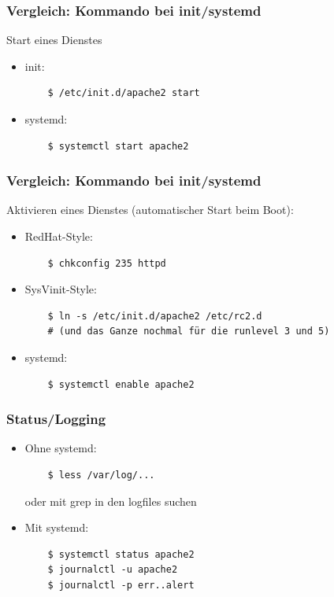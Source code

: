\begin{frame}[fragile]

\frametitle{Vergleich: Kommando bei init/systemd}

  Start eines Dienstes
  \begin{itemize}
    \item init:
    \begin{verbatim}
    $ /etc/init.d/apache2 start
    \end{verbatim}

    \item systemd:
    \begin{verbatim}
    $ systemctl start apache2
    \end{verbatim}
  \end{itemize}

\end{frame}

\begin{frame}[fragile]
\frametitle{Vergleich: Kommando bei init/systemd}

  Aktivieren eines Dienstes (automatischer Start beim Boot):
  \begin{itemize}

    \item RedHat-Style:
    \begin{verbatim}
    $ chkconfig 235 httpd
    \end{verbatim}

    \item SysVinit-Style:
    \begin{verbatim}
    $ ln -s /etc/init.d/apache2 /etc/rc2.d
    # (und das Ganze nochmal für die runlevel 3 und 5)
    \end{verbatim}

    \item systemd:
    \begin{verbatim}
    $ systemctl enable apache2
    \end{verbatim}

  \end{itemize}

\end{frame}


\begin{frame}[fragile]
\frametitle{Status/Logging}

  \begin{itemize}

    \item Ohne systemd:
    \begin{verbatim}
    $ less /var/log/...
    \end{verbatim}
    oder mit grep in den logfiles suchen

    \item Mit systemd:
    \begin{verbatim}
    $ systemctl status apache2
    $ journalctl -u apache2
    $ journalctl -p err..alert
    \end{verbatim}

  \end{itemize}

\end{frame}

